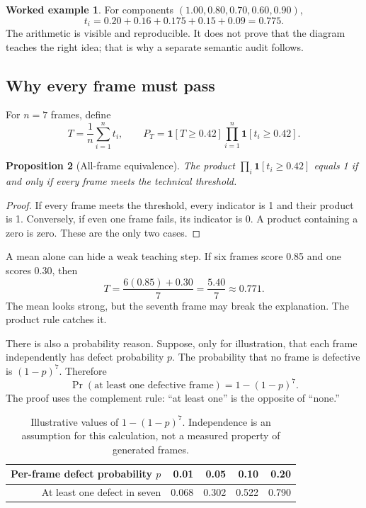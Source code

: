\documentclass[11pt]{article}
\newcommand{\ind}[1]{\mathbf{1}\!\left[#1\right]}
\theoremstyle{plain}
\newtheorem{proposition}{Proposition}[section]
\theoremstyle{definition}
\newtheorem{workedexample}[proposition]{Worked example}
\begin{document}
\begin{workedexample}
For components $(1.00,0.80,0.70,0.60,0.90)$,
\[
t_i=0.20+0.16+0.175+0.15+0.09=0.775.
\]
The arithmetic is visible and reproducible. It does not prove that the diagram teaches the right idea; that is why a separate semantic audit follows.
\end{workedexample}

\subsection{Why every frame must pass}

For $n=7$ frames, define
\[
T=\frac1n\sum_{i=1}^nt_i,
\qquad
P_T=\ind{T\ge0.42}\prod_{i=1}^{n}\ind{t_i\ge0.42}.
\]

\begin{proposition}[All-frame equivalence]
\label{prop:allframe}
The product $\prod_i\ind{t_i\ge0.42}$ equals 1 if and only if every frame meets the technical threshold.
\end{proposition}

\begin{proof}
If every frame meets the threshold, every indicator is 1 and their product is 1. Conversely, if even one frame fails, its indicator is 0. A product containing a zero is zero. These are the only two cases.
\end{proof}

A mean alone can hide a weak teaching step. If six frames score 0.85 and one scores 0.30, then
\[
T=\frac{6(0.85)+0.30}{7}=\frac{5.40}{7}\approx0.771.
\]
The mean looks strong, but the seventh frame may break the explanation. The product rule catches it.

There is also a probability reason. Suppose, only for illustration, that each frame independently has defect probability $p$. The probability that no frame is defective is $(1-p)^7$. Therefore
\begin{equation}
\Pr(\text{at least one defective frame})=1-(1-p)^7.
\label{eq:any-defect}
\end{equation}
The proof uses the complement rule: ``at least one'' is the opposite of ``none.''

\begin{table}[H]
\centering
\begin{tabular}{@{}rrrrr@{}}
\toprule
Per-frame defect probability $p$ & 0.01 & 0.05 & 0.10 & 0.20 \\
\midrule
At least one defect in seven & 0.068 & 0.302 & 0.522 & 0.790 \\
\bottomrule
\end{tabular}
\caption{Illustrative values of $1-(1-p)^7$. Independence is an assumption for this calculation, not a measured property of generated frames.}
\end{table}
\end{document}
